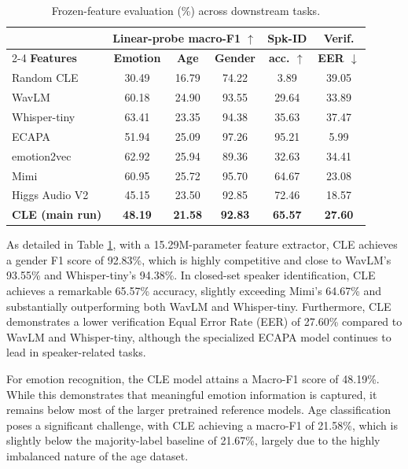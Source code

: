 \begin{table}[htbp]
    \centering
    \caption{Frozen-feature evaluation (\%) across downstream tasks.}
    \label{tab:frozen_eval}
    \renewcommand{\arraystretch}{1.3}
    \begin{tabular}{l c c c c c}
        \toprule
        & \multicolumn{3}{c}{\textbf{Linear-probe macro-F1 $\uparrow$}} & \textbf{Spk-ID} & \textbf{Verif.} \\
        \cmidrule(lr){2-4}
        \textbf{Features} & \textbf{Emotion} & \textbf{Age} & \textbf{Gender} & \textbf{acc. $\uparrow$} & \textbf{EER $\downarrow$} \\
        \midrule
        Random CLE & 30.49 & 16.79 & 74.22 & 3.89 & 39.05 \\
        WavLM & 60.18 & 24.90 & 93.55 & 29.64 & 33.89 \\
        Whisper-tiny & 63.41 & 23.35 & 94.38 & 35.63 & 37.47 \\
        ECAPA & 51.94 & 25.09 & 97.26 & 95.21 & 5.99 \\
        emotion2vec & 62.92 & 25.94 & 89.36 & 32.63 & 34.41 \\
        Mimi & 60.95 & 25.72 & 95.70 & 64.67 & 23.08 \\
        Higgs Audio V2 & 45.15 & 23.50 & 92.85 & 72.46 & 18.57 \\
        \midrule
        \textbf{CLE (main run)} & \textbf{48.19} & \textbf{21.58} & \textbf{92.83} & \textbf{65.57} & \textbf{27.60} \\
        \bottomrule
    \end{tabular}
\end{table}

As detailed in Table \ref{tab:frozen_eval}, with a 15.29M-parameter feature extractor, CLE achieves a gender F1 score of 92.83\%, which is highly competitive and close to WavLM's 93.55\% and Whisper-tiny's 94.38\%. In closed-set speaker identification, CLE achieves a remarkable 65.57\% accuracy, slightly exceeding Mimi's 64.67\% and substantially outperforming both WavLM and Whisper-tiny. Furthermore, CLE demonstrates a lower verification Equal Error Rate (EER) of 27.60\% compared to WavLM and Whisper-tiny, although the specialized ECAPA model continues to lead in speaker-related tasks.

For emotion recognition, the CLE model attains a Macro-F1 score of 48.19\%. While this demonstrates that meaningful emotion information is captured, it remains below most of the larger pretrained reference models. Age classification poses a significant challenge, with CLE achieving a macro-F1 of 21.58\%, which is slightly below the majority-label baseline of 21.67\%, largely due to the highly imbalanced nature of the age dataset. 

